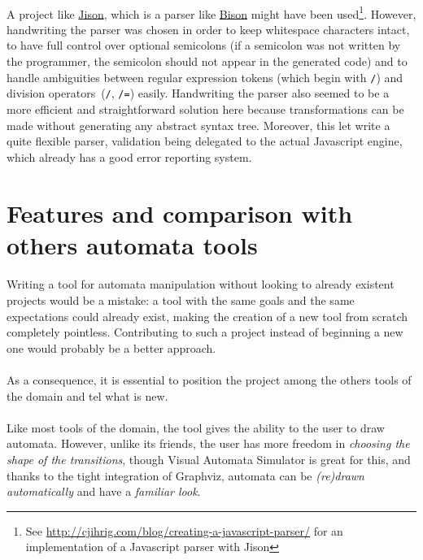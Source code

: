 \documentclass{article}
\begin{document}
\begin{sloppypar}
   
\paragraph{}
A project like \href{http://zaach.github.io/jison/}{Jison}, which is a parser like \href{http://www.gnu.org/software/bison/}{Bison} might have been used\footnote{See \href{http://cjihrig.com/blog/creating-a-javascript-parser/}{http://cjihrig.com/blog/creating-a-javascript-parser/} for an implementation of a Javascript parser with Jison}. However, handwriting the parser was chosen in order to keep whitespace characters intact, to have full control over optional semicolons (if a semicolon was not written by the programmer, the semicolon should not appear in the generated code) and to handle ambiguities between regular expression tokens (which begin with \lstinline!/!) and division operators (\lstinline!/!, \lstinline!/=!) easily. Handwriting the parser also seemed to be a more efficient and straightforward solution here because transformations can be made without generating any abstract syntax tree. Moreover, this let write a quite flexible parser, validation being delegated to the actual Javascript engine, which already has a good error reporting system.




\section{ Features and comparison with others automata tools}


\paragraph{}
Writing a tool for automata manipulation without looking to already existent projects would be a mistake: a tool with the same goals and the same expectations could already exist, making the creation of a new tool from scratch completely pointless. Contributing to such a project instead of beginning a new one would probably be a better approach.

   
\paragraph{}
As a consequence, it is essential to position the project among the others tools of the domain and tel what is new.

   
\paragraph{}
Like most tools of the domain, the tool gives the ability to the user to draw automata. However, unlike its friends, the user has more freedom in {\em choosing the shape of the transitions}, though Visual Automata Simulator is great for this, and thanks to the tight integration of Graphviz, automata can be {\em (re)drawn automatically} and have a {\em familiar look}.
   

\end{sloppypar}
\end{document}
